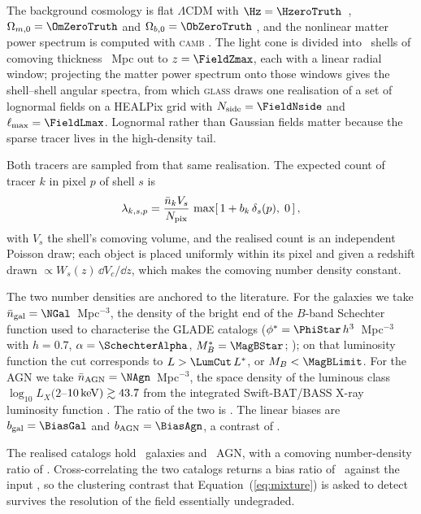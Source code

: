 The background cosmology is flat $\Lambda$CDM with $\Hz = \HzeroTruth$~\kmsmpc,
$\Omega_{m,0} = \OmZeroTruth$ and $\Omega_{b,0} = \ObZeroTruth$
\citep{Planck2015}, and the nonlinear matter power spectrum is computed with
\textsc{camb} \citep{Lewis2000}. The light cone is divided into \FieldNshell\
shells of comoving thickness \FieldShellDx~Mpc out to $z = \FieldZmax$, each
with a linear radial window; projecting the matter power spectrum onto those
windows gives the shell--shell angular spectra, from which \textsc{glass}
\citep{Tessore2023} draws one realisation of a set of lognormal fields on a
HEALPix \citep{Gorski2005} grid with $N_{\rm side} = \FieldNside$ and $\ell_{\rm max} =
\FieldLmax$. Lognormal rather than Gaussian fields matter because the sparse
tracer lives in the high-density tail.

Both tracers are sampled from that same realisation. The expected count of
tracer $k$ in pixel $p$ of shell $s$ is
\begin{equation}
  \lambda_{k,s,p} = \frac{\bar{n}_k V_{s}}{N_{\rm pix}}\,
     \max\!\left[\, 1 + b_k\, \delta_s(p),\; 0 \,\right],
  \label{eq:poisson}
\end{equation}
with $V_s$ the shell's comoving volume, and the realised count is an
independent Poisson draw; each object is placed uniformly within its pixel and
given a redshift drawn $\propto W_s(z)\,\dd V_c/\dd z$, which makes the comoving
number density constant.

The two number densities are anchored to the literature. For the galaxies we
take $\bar{n}_{\rm gal} = \NGal$~Mpc$^{-3}$, the density of the bright end of
the $B$-band Schechter \citep{Schechter1976} function used to characterise the GLADE catalogs
($\phi^* = \PhiStar\,h^3$~Mpc$^{-3}$ with $h = 0.7$,
$\alpha = \SchechterAlpha$,
$M_B^* = \MagBStar$; \citealt{Dalya2018, Dalya2022}); on that luminosity
function the cut corresponds to $L > \LumCut\,L^*$, or
$M_B < \MagBLimit$. For the AGN we take $\bar{n}_{\rm AGN} = \NAgn$~Mpc$^{-3}$,
the space density of the luminous class $\log_{10} L_X(2$--$10\,{\rm keV})
\gtrsim 43.7$ from the integrated Swift-BAT/BASS X-ray luminosity function
\citep{Ananna2022}. The ratio of the two is \DensityRatioTarget. The linear
biases are $b_{\rm gal} = \BiasGal$ and $b_{\rm AGN} = \BiasAgn$, a contrast of
\BiasRatio.

The realised catalogs hold \CatNgal\ galaxies and \CatNagn\ AGN, with a
comoving number-density ratio of \DensityRatio. Cross-correlating the two
catalogs returns a bias ratio of \BiasRatioMeas\ against the input
\BiasRatio, so the clustering contrast that
Equation~(\ref{eq:mixture}) is asked to detect survives the resolution of the
field essentially undegraded.

